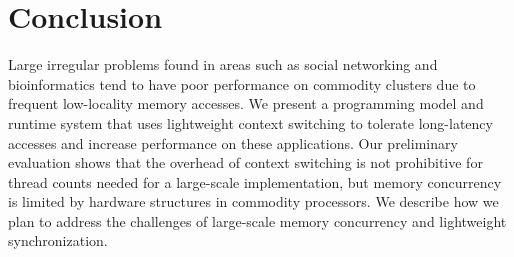 \documentclass{acm_proc_article-sp}
\begin{document}
\section{Conclusion}

Large irregular problems found in areas such as social networking and
bioinformatics tend to have poor performance on commodity clusters due
to frequent low-locality memory accesses. We present a programming
model and runtime system that uses lightweight context switching to
tolerate long-latency accesses and increase performance on these
applications. Our preliminary evaluation shows that the overhead of
context switching is not prohibitive for thread counts needed for a
large-scale implementation, but memory concurrency is limited by
hardware structures in commodity processors. We describe how we plan
to address the challenges of large-scale memory concurrency and
lightweight synchronization.




\end{document}
